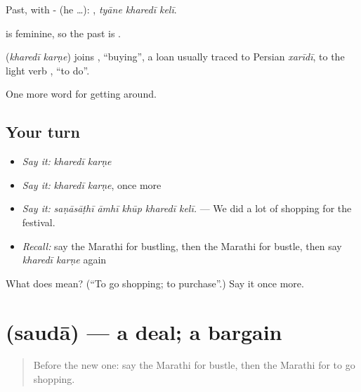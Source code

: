 Past, with - (he …):   , \emph{tyāne kharedī kelī}.

 is feminine, so the past is  .

\begin{cousinweb}
\textbf{ } (\emph{kharedī karṇe}) joins \textbf{}, \textquotedblleft{}buying\textquotedblright{}, a loan usually traced to Persian \emph{xarīdī}, to the light verb \textbf{}, \textquotedblleft{}to do\textquotedblright{}.
\end{cousinweb}

\begin{grammarlens}[title={What you've built}]
One more word for getting around.
\end{grammarlens}

\subsection*{Your turn}
\begin{itemize}
\raggedright
  \item \emph{Say it:} \emph{kharedī karṇe}
  \item \emph{Say it:} \emph{kharedī karṇe}, once more
  \item \emph{Say it:} \emph{saṇāsāṭhī āmhī khūp kharedī kelī.} — We did a lot of shopping for the festival.
  \item \emph{Recall:} say the Marathi for bustling, then the Marathi for bustle, then say \emph{kharedī karṇe} again
\end{itemize}

\begin{tcolorbox}[breakable,colback=teal!4,colframe=teal!35!black,title={Before you move on}]
What does   mean? (\textquotedblleft{}To go shopping; to purchase\textquotedblright{}.) Say it once more.
\end{tcolorbox}
\section[\texorpdfstring{\mr{सौदा} (saudā)}{सौदा (saudā)}]{ (saudā) — a deal; a bargain}

\label{lesson:MR-C423-sauda}



\begin{quote}
Before the new one: say the Marathi for bustle, then the Marathi for to go shopping.
\end{quote}

